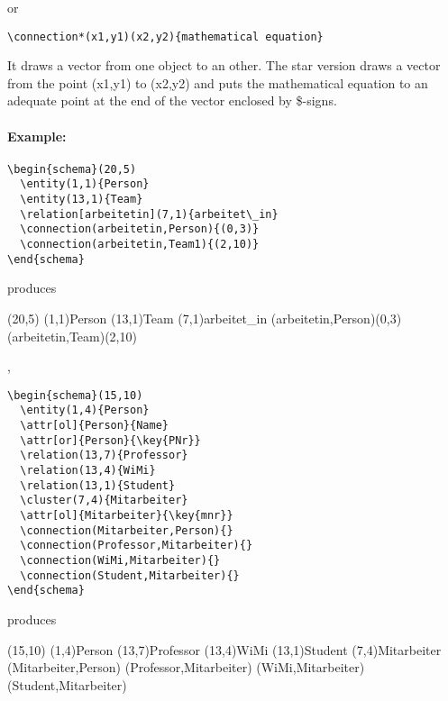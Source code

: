 \documentclass[a4paper,11pt]{article}
\begin{document}
or

\begin{verbatim}
\connection*(x1,y1)(x2,y2){mathematical equation}
\end{verbatim}

It draws a vector from one object to an other. The star version draws 
a vector from the point (x1,y1) to (x2,y2) and puts the mathematical 
equation to an adequate point at the end of the vector enclosed by \$-signs. 

\paragraph{Example:}

\begin{verbatim}
\begin{schema}(20,5)
  \entity(1,1){Person}
  \entity(13,1){Team}
  \relation[arbeitetin](7,1){arbeitet\_in}
  \connection(arbeitetin,Person){(0,3)}
  \connection(arbeitetin,Team1){(2,10)}
\end{schema}
\end{verbatim}

produces

\begin{schema}(20,5)
  \entity(1,1){Person}
  \entity(13,1){Team}
  \relation[arbeitetin](7,1){arbeitet\_in}
  \connection(arbeitetin,Person){(0,3)}
  \connection(arbeitetin,Team){(2,10)}
\end{schema}

, 

\begin{verbatim}
\begin{schema}(15,10)
  \entity(1,4){Person}
  \attr[ol]{Person}{Name}
  \attr[or]{Person}{\key{PNr}}
  \relation(13,7){Professor}
  \relation(13,4){WiMi}
  \relation(13,1){Student}
  \cluster(7,4){Mitarbeiter}
  \attr[ol]{Mitarbeiter}{\key{mnr}}
  \connection(Mitarbeiter,Person){}
  \connection(Professor,Mitarbeiter){}
  \connection(WiMi,Mitarbeiter){}
  \connection(Student,Mitarbeiter){}
\end{schema}
\end{verbatim}

produces

\begin{schema}(15,10)
  \entity(1,4){Person}
  \relation(13,7){Professor}
  \relation(13,4){WiMi}
  \relation(13,1){Student}
  \cluster(7,4){Mitarbeiter}
  \connection(Mitarbeiter,Person){}
  \connection(Professor,Mitarbeiter){}
  \connection(WiMi,Mitarbeiter){}
  \connection(Student,Mitarbeiter){}
\end{schema}
\end{document}
